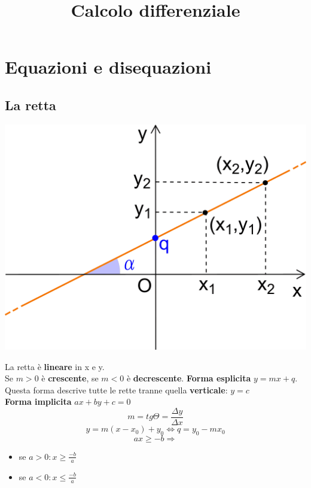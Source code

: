 \documentclass{report}
\title{Calcolo differenziale}
\begin{document}
\maketitle
\section{Equazioni e disequazioni}
    \subsection{La retta}
        \begin{center}
            \includegraphics[width=\textwidth]{retta.png}
        \end{center}
        La retta è \textbf{lineare} in x e y. \\
        Se $ m > 0 $ è \textbf{crescente}, se $ m < 0 $ è \textbf{decrescente}.
        \textbf{Forma esplicita} $ y = mx + q $. \\
        Questa forma descrive tutte le rette tranne quella \textbf{verticale}: $ y = c $ \\
        \textbf{Forma implicita} $ ax + by + c = 0 $
        $$ m = tg\Theta = \frac{\Delta y}{\Delta x} $$
        $$ y = m(x - x_0) + y_0 \Longleftrightarrow q = y_0 - mx_0 $$
        $$ ax \geq -b \Longrightarrow $$
        \begin{itemize}
            \item se $a > 0: x \geq \frac{-b}{a} $
            \item se $a < 0: x \leq \frac{-b}{a} $
        \end{itemize}
\end{document}
